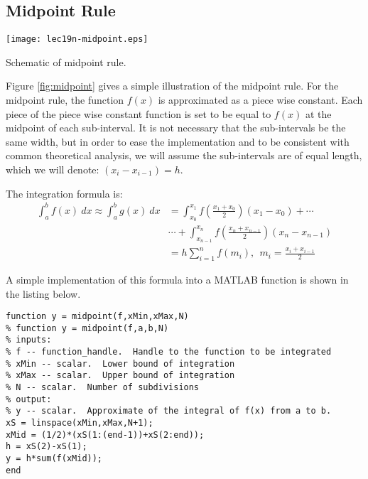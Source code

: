 \subsection{Midpoint Rule}
 
 \begin{marginfigure}
 \texttt{[image: lec19n-midpoint.eps]}
 \caption{Schematic of midpoint rule.}
 \label{fig:midpoint}
 \end{marginfigure}
 
 Figure \ref{fig:midpoint} gives a simple illustration of the midpoint rule.  For the midpoint rule, the function $f(x)$ is approximated as a piece wise constant.  Each piece of the piece wise constant function is set to be equal to $f(x)$ at the midpoint of each sub-interval.  It is not necessary that the sub-intervals be the same width, but in order to ease the implementation and to be consistent with common theoretical analysis, we will assume the sub-intervals are of equal length, which we will denote: $(x_i - x_{i-1})=h$.
 
 The integration formula is:
 \begin{align*}
 \int_{a}^{b} f(x) \ dx \approx \int_{a}^{b} g(x) \ dx &= \int_{x_0}^{x_1}f\left(\frac{x_1 + x_0}{2}\right)(x_1 - x_0) + \cdots \\
 & \cdots + \int_{x_{n-1}}^{x_n}f\left(\frac{x_n + x_{n-1}}{2} \right)(x_n - x_{n-1})  \\
 &= h \sum\limits_{i=1}^{n} f(m_i), \ \ m_i = \frac{x_i+x_{i-1}}{2} 
 \end{align*}
 
 A simple implementation of this formula into a MATLAB function is shown in the listing below.
 \begin{lstlisting}[style=myMatlab,name=lec19n-midpoint]
 function y = midpoint(f,xMin,xMax,N)
% function y = midpoint(f,a,b,N)
% inputs:
% f -- function_handle.  Handle to the function to be integrated
% xMin -- scalar.  Lower bound of integration
% xMax -- scalar.  Upper bound of integration
% N -- scalar.  Number of subdivisions
% output:
% y -- scalar.  Approximate of the integral of f(x) from a to b.
xS = linspace(xMin,xMax,N+1);
xMid = (1/2)*(xS(1:(end-1))+xS(2:end));
h = xS(2)-xS(1);
y = h*sum(f(xMid));
end
 \end{lstlisting}
 
